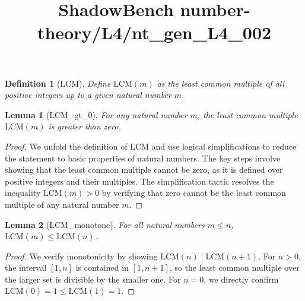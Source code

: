 \documentclass{article}
\title{ShadowBench number-theory/L4/nt\_gen\_L4\_002}
\newtheorem{lemma}{Lemma}
\newtheorem{definition}{Definition}
\begin{document}
\maketitle

\begin{definition}[LCM]
Define \(\text{LCM}(m)\) as the least common multiple of all positive integers up to a given natural number \( m \).
\end{definition}

\begin{lemma}[LCM_gt_0]
For any natural number \( m \), the least common multiple \( \text{LCM}(m) \) is greater than zero.
\end{lemma}
\begin{proof}
We unfold the definition of \( \text{LCM} \) and use logical simplifications to reduce the statement to basic properties of natural numbers. The key steps involve showing that the least common multiple cannot be zero, as it is defined over positive integers and their multiples. The simplification tactic resolves the inequality \( \text{LCM}(m) > 0 \) by verifying that zero cannot be the least common multiple of any natural number \( m \).
\end{proof}

\begin{lemma}[LCM_monotone]
For all natural numbers \( m \le n \), \( \mathrm{LCM}(m) \le \mathrm{LCM}(n) \).
\end{lemma}
\begin{proof}
We verify monotonicity by showing \( \mathrm{LCM}(n) \mid \mathrm{LCM}(n+1) \). For \( n > 0 \), the interval \( [1, n] \) is contained in \( [1, n+1] \), so the least common multiple over the larger set is divisible by the smaller one. For \( n = 0 \), we directly confirm \( \mathrm{LCM}(0) = 1 \le \mathrm{LCM}(1) = 1 \).
\end{proof}
\end{document}
